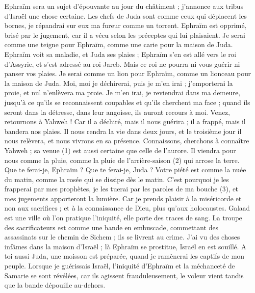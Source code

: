 \begin{multicols}{2}
Ephraïm sera un sujet d’épouvante au jour du châtiment ; j’annonce aux tribus d'Israël une chose certaine.
Les chefs de Juda sont comme ceux qui déplacent les bornes, je répandrai sur eux ma fureur comme un torrent.
Ephraïm est opprimé, brisé par le jugement, car il a vécu selon les préceptes qui lui plaisaient.
Je serai comme une teigne pour Ephraïm, comme une carie pour la maison de Juda.
Ephraïm voit sa maladie, et Juda ses plaies ; Ephraïm s'en est allé vers le roi d'Assyrie, et s’est adressé au roi Jareb. Mais ce roi ne pourra ni vous guérir ni panser vos plaies.
Je serai comme un lion pour Ephraïm, comme un lionceau pour la maison de Juda. Moi, moi je déchirerai, puis je m'en irai ; j'emporterai la proie, et nul n’enlèvera ma proie.
Je m'en irai, je reviendrai dans ma demeure, jusqu'à ce qu'ils se reconnaissent coupables et qu'ils cherchent ma face ; quand ils seront dans la détresse, dans leur angoisse, ils auront recours à moi.
\VerseOne{}Venez, retournons à Yahweh ! Car il a déchiré, mais il nous guérira ; il a frappé, mais il bandera nos plaies.
Il nous rendra la vie dans deux jours, et le troisième jour il nous relèvera, et nous vivrons en sa présence.
Connaissons, cherchons à connaître Yahweh ; sa venue (1) est aussi certaine que celle de l’aurore. Il viendra pour nous comme la pluie, comme la pluie de l’arrière-saison (2) qui arrose la terre.
Que te ferai-je, Ephraïm ? Que te ferai-je, Juda ? Votre piété est comme la nuée du matin, comme la rosée qui se dissipe dès le matin.
C'est pourquoi je les frapperai par mes prophètes, je les tuerai par les paroles de ma bouche (3), et mes jugements apporteront la lumière.
Car je prends plaisir à la miséricorde et non aux sacrifices ; et à la connaissance de Dieu, plus qu’aux holocaustes.
Galaad est une ville où l’on pratique l’iniquité, elle porte des traces de sang.
La troupe des sacrificateurs est comme une bande en embuscade, commettant des assassinats sur le chemin de Sichem ; ils se livrent au crime.
J'ai vu des choses infâmes dans la maison d'Israël ; là Ephraïm se prostitue, Israël en est souillé.
A toi aussi Juda, une moisson est préparée, quand je ramènerai les captifs de mon peuple.
\VerseOne{}Lorsque je guérissais Israël, l'iniquité d'Ephraïm et la méchanceté de Samarie se sont révélées, car ils agissent frauduleusement, le voleur vient tandis que la bande dépouille au-dehors.

\end{multicols}
